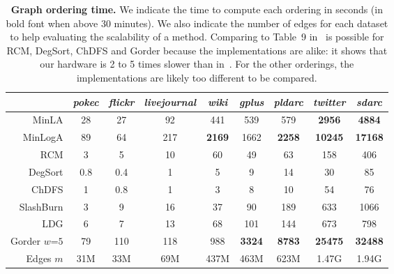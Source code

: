 \begin{table}[h]
\centering
\begin{tabular}{r||c|c|c|c|c|c|c|c}
& \textit{pokec} & \textit{flickr} & \textit{livejournal} & \textit{wiki} & \textit{gplus} & \textit{pldarc} & \textit{twitter} & \textit{sdarc}\\ 
  \hline%
MinLA & 28 & 27 & 92 & 441 & 539 & 579 & \textbf{2956} & \textbf{4884}\\
MinLogA & 89 & 64 & 217 & \textbf{2169} & 1662 & \textbf{2258} & \textbf{10245} & \textbf{17168}\\
RCM & 3 & 5 & 10 & 60 & 49 & 63 & 158 & 406\\
DegSort & 0.8 & 0.4 & 1 & 5 & 9 & 14 & 30 & 85\\
ChDFS & 1 & 0.8 & 1 & 3 & 8 & 10 & 54 & 76\\
SlashBurn & 3 & 9 & 16 & 37 & 90 & 189 & 633 & 1066\\
LDG & 6 & 7 & 13 & 68 & 101 & 144 & 673 & 798\\
Gorder \footnotesize{$w$=$5$} & 79 & 110 & 118 & 988 & \textbf{3324} & \textbf{8783} & \textbf{25475} & \textbf{32488} \\
\hline
  Edges \footnotesize{$m$} & 31M & 33M & 69M & 437M & 463M & 623M & 1.47G & 1.94G
\end{tabular}
\caption{\textbf{Graph ordering time.} We indicate the time to compute each ordering in seconds (in bold font when above 30 minutes). We also indicate the number of edges for each dataset to help evaluating the scalability of a method. Comparing to Table~9 in~\cite{gorder} is possible for RCM, DegSort, ChDFS and Gorder because the implementations are alike: it shows that our hardware is 2 to 5 times slower than in~\cite{gorder}. For the other orderings, the implementations are likely too different to be compared.}\label{table-order-time}
\end{table}

